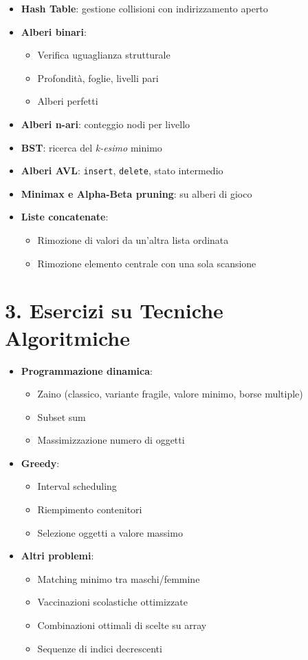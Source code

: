 \documentclass[a4paper,12pt]{article}
\begin{document}
\begin{itemize}[itemsep=0.3em]
  \item \textbf{Hash Table}: gestione collisioni con indirizzamento aperto
  \item \textbf{Alberi binari}:
  \begin{itemize}
    \item Verifica uguaglianza strutturale
    \item Profondità, foglie, livelli pari
    \item Alberi perfetti
  \end{itemize}
  \item \textbf{Alberi n-ari}: conteggio nodi per livello
  \item \textbf{BST}: ricerca del \textit{k-esimo} minimo
  \item \textbf{Alberi AVL}: \texttt{insert}, \texttt{delete}, stato intermedio
  \item \textbf{Minimax e Alpha-Beta pruning}: su alberi di gioco
  \item \textbf{Liste concatenate}:
  \begin{itemize}
    \item Rimozione di valori da un’altra lista ordinata
    \item Rimozione elemento centrale con una sola scansione
  \end{itemize}
\end{itemize}

\vspace{1em}
\section*{3. Esercizi su Tecniche Algoritmiche}

\begin{itemize}[itemsep=0.3em]
  \item \textbf{Programmazione dinamica}:
  \begin{itemize}
    \item Zaino (classico, variante fragile, valore minimo, borse multiple)
    \item Subset sum
    \item Massimizzazione numero di oggetti
  \end{itemize}
  \item \textbf{Greedy}:
  \begin{itemize}
    \item Interval scheduling
    \item Riempimento contenitori
    \item Selezione oggetti a valore massimo
  \end{itemize}
  \item \textbf{Altri problemi}:
  \begin{itemize}
    \item Matching minimo tra maschi/femmine
    \item Vaccinazioni scolastiche ottimizzate
    \item Combinazioni ottimali di scelte su array
    \item Sequenze di indici decrescenti
  \end{itemize}
\end{itemize}
\end{document}
